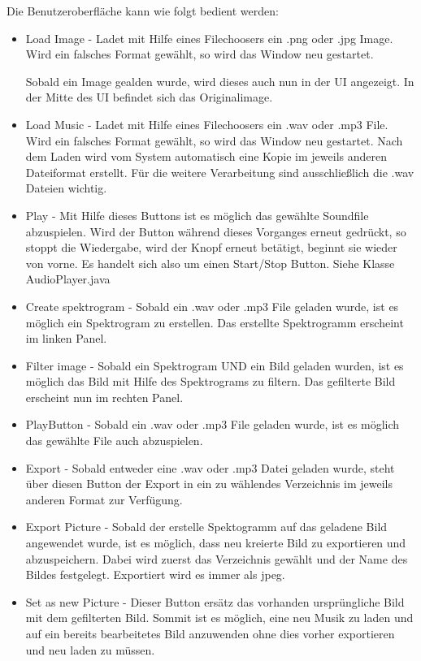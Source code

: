 \documentclass[12pt,a4paper]{article}
\begin{document}
Die Benutzeroberfläche kann wie folgt bedient werden:
\begin{itemize}
	\item Load Image - Ladet mit Hilfe eines Filechoosers ein .png oder .jpg Image. Wird ein falsches Format gewählt, so wird das Window neu gestartet.
	
	Sobald ein Image gealden wurde, wird dieses auch nun in der UI angezeigt. In der Mitte des UI befindet sich das Originalimage.
	\item Load Music - Ladet mit Hilfe eines Filechoosers ein .wav oder .mp3 File. Wird ein falsches Format gewählt, so wird das Window neu gestartet. Nach dem Laden wird vom System automatisch eine Kopie im jeweils anderen Dateiformat erstellt. Für die weitere Verarbeitung sind ausschließlich die .wav Dateien wichtig.

	\item Play - Mit Hilfe dieses Buttons ist es möglich das gewählte Soundfile abzuspielen. Wird der Button während dieses Vorganges erneut gedrückt, so stoppt die Wiedergabe, wird der Knopf erneut betätigt, beginnt sie wieder von vorne. Es handelt sich also um einen Start/Stop Button. Siehe Klasse AudioPlayer.java

	\item Create spektrogram - Sobald ein .wav  oder .mp3 File geladen wurde, ist es möglich ein Spektrogram zu erstellen. Das erstellte Spektrogramm erscheint im linken Panel.
	\item Filter image - Sobald ein Spektrogram UND ein Bild geladen wurden, ist es möglich das Bild mit Hilfe des Spektrograms zu filtern. Das gefilterte Bild erscheint nun im rechten Panel.
	
	\item PlayButton - Sobald ein .wav oder .mp3 File geladen wurde, ist es möglich das gewählte File auch abzuspielen.
	
	\item Export - Sobald entweder eine .wav oder .mp3 Datei geladen wurde, steht über diesen Button der Export in ein zu wählendes Verzeichnis im jeweils anderen Format zur Verfügung.
	
	\item Export Picture - Sobald der erstelle Spektogramm auf das geladene Bild angewendet wurde, ist es möglich, dass neu kreierte Bild zu exportieren und abzuspeichern. Dabei wird zuerst das Verzeichnis gewählt und der Name des Bildes festgelegt. Exportiert wird es immer als jpeg.
	\item Set as new Picture - Dieser Button ersätz das vorhanden ursprüngliche Bild mit dem gefilterten Bild. Sommit ist es möglich, eine neu Musik zu laden und auf ein bereits bearbeitetes Bild anzuwenden ohne dies vorher exportieren und neu laden zu müssen.
\end{itemize}
\end{document}
